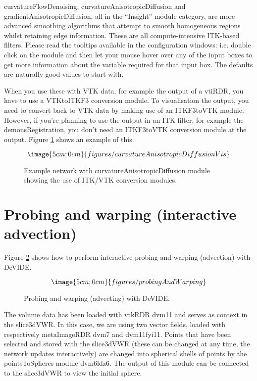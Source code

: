 curvatureFlowDenoising, curvatureAnisotropicDiffusion and
gradientAnisotropicDiffusion, all in the ``Insight'' module category,
are more advanced smoothing algorithms that attempt to smooth
homogeneous regions whilst retaining edge information.  These are all
compute-intensive ITK-based filters.  Please read the tooltips
available in the configuration windows: i.e. double click on the
module and then let your mouse hover over any of the input boxes to
get more information about the variable required for that input box.
The defaults are naturally good values to start with.

When you use these with VTK data, for example the output of a vtiRDR,
you have to use a VTKtoITKF3 conversion module.  To visualisation the
output, you need to convert back to VTK data by making use of an
ITKF3toVTK module.  However, if you're planning to use the output in
an ITK filter, for example the demonsRegistration, you don't need an
ITKF3toVTK conversion module at the output.  Figure \ref{figCADvis}
shows an example of this.

\begin{figure}
$$\image{5cm;0cm}{figures/curvatureAnisotropicDiffusionVis}$$
\caption{Example network with curvatureAnisotropicDiffusion module
showing the use of ITK/VTK conversion modules.}\label{figCADvis}
\end{figure}

\section{Probing and warping (interactive advection)}
Figure \ref{figPAW} shows how to perform interactive probing and
warping (advection) with DeVIDE.

\begin{figure}
$$\image{5cm;0cm}{figures/probingAndWarping}$$
\caption{Probing and warping (advecting) with DeVIDE.}\label{figPAW}
\end{figure}

The volume data has been loaded with vtkRDR dvm11 and serves as
context in the slice3dVWR.  In this case, we are using two vector
fields, loaded with respectively metaImageRDR dvm7 and dvm11fyi11.
Points that have been selected and stored with the slice3dVWR (these
can be changed at any time, the network updates interactively) are
changed into spherical shells of points by the pointsToSpheres module
dvm6ldz6.  The output of this module can be connected to the
slice3dVWR to view the initial sphere.

